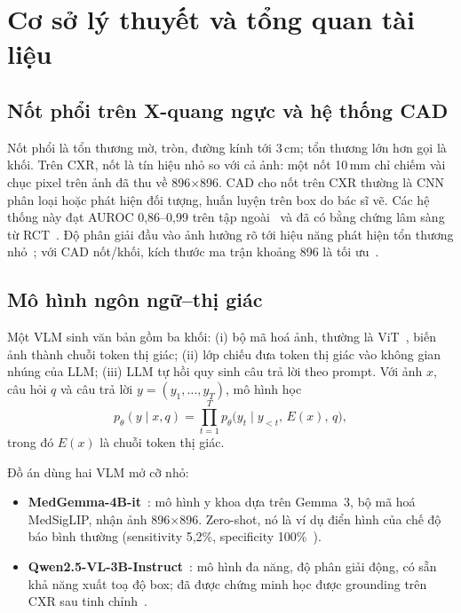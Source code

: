 \clearpage
\section{Cơ sở lý thuyết và tổng quan tài liệu}
\label{sec:background}

\subsection{Nốt phổi trên X-quang ngực và hệ thống CAD}

Nốt phổi là tổn thương mờ, tròn, đường kính tới 3\,cm; tổn thương lớn hơn gọi là khối. Trên CXR, nốt là tín
hiệu nhỏ so với cả ảnh: một nốt 10\,mm chỉ chiếm vài chục pixel trên ảnh đã thu về 896$\times$896. CAD cho nốt
trên CXR thường là CNN phân loại hoặc phát hiện đối tượng, huấn luyện trên box do bác sĩ vẽ. Các hệ thống này
đạt AUROC 0,86--0,99 trên tập ngoài~\cite{nam2019dlad,vanleeuwen2024commercial,lee2020dl} và đã có bằng chứng
lâm sàng từ RCT~\cite{nam2023rct}. Độ phân giải đầu vào ảnh hưởng rõ tới hiệu năng phát hiện tổn thương
nhỏ~\cite{sabottke2020resolution}; với CAD nốt/khối, kích thước ma trận khoảng 896 là tối ưu~\cite{kim2020matrix}.

\subsection{Mô hình ngôn ngữ--thị giác}

Một VLM sinh văn bản gồm ba khối: (i) bộ mã hoá ảnh, thường là ViT~\cite{dosovitskiy2021vit}, biến ảnh thành
chuỗi token thị giác; (ii) lớp chiếu đưa token thị giác vào không gian nhúng của LLM; (iii) LLM tự hồi quy sinh
câu trả lời theo prompt. Với ảnh $x$, câu hỏi $q$ và câu trả lời $y = (y_1,\dots,y_T)$, mô hình học
\begin{equation}
  p_\theta(y \mid x, q) = \prod_{t=1}^{T} p_\theta\big(y_t \mid y_{<t},\, E(x),\, q\big),
\end{equation}
trong đó $E(x)$ là chuỗi token thị giác.

Đồ án dùng hai VLM mở cỡ nhỏ:
\begin{itemize}
  \item \textbf{MedGemma-4B-it}~\cite{sellergren2026medgemma}: mô hình y khoa dựa trên Gemma~3, bộ mã hoá
        MedSigLIP, nhận ảnh 896$\times$896. Zero-shot, nó là ví dụ điển hình của chế độ báo bình thường
        (sensitivity 5,2\%, specificity 100\%~\cite{nishio2026zeroshot}).
  \item \textbf{Qwen2.5-VL-3B-Instruct}~\cite{bai2025qwen25vl}: mô hình đa năng, độ phân giải động, có sẵn khả
        năng xuất toạ độ box; đã được chứng minh học được grounding trên CXR sau tinh chỉnh~\cite{xu2025medground}.
\end{itemize}

